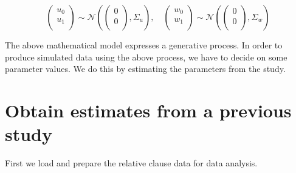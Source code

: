\documentclass[12pt,]{krantz}
\newenvironment{Shaded}{\begin{snugshade}}{\end{snugshade}}
\newcommand{\DataTypeTok}[1]{\textcolor[rgb]{0.13,0.29,0.53}{#1}}
\newcommand{\DecValTok}[1]{\textcolor[rgb]{0.00,0.00,0.81}{#1}}
\newcommand{\KeywordTok}[1]{\textcolor[rgb]{0.13,0.29,0.53}{\textbf{#1}}}
\newcommand{\NormalTok}[1]{#1}
\newcommand{\OperatorTok}[1]{\textcolor[rgb]{0.81,0.36,0.00}{\textbf{#1}}}
\newcommand{\OtherTok}[1]{\textcolor[rgb]{0.56,0.35,0.01}{#1}}
\newcommand{\StringTok}[1]{\textcolor[rgb]{0.31,0.60,0.02}{#1}}
\begin{document}
\begin{equation}\label{eq:jointpriordistsimulation}
\begin{pmatrix}
  u_0 \\ 
  u_1 \\
\end{pmatrix}
\sim 
\mathcal{N} \left(
\begin{pmatrix}
  0 \\
  0 \\
\end{pmatrix},
\Sigma_{u}
\right),
\quad
\begin{pmatrix}
  w_0 \\ 
  w_1 \\
\end{pmatrix}
\sim 
\mathcal{N}\left(
\begin{pmatrix}
  0 \\
  0 \\
\end{pmatrix},
\Sigma_{w}
\right)
\end{equation}

The above mathematical model expresses a generative process. In order to produce simulated data using the above process, we have to decide on some parameter values. We do this by estimating the parameters from the \citet{grodner} study.

\hypertarget{obtain-estimates-from-a-previous-study}{%
\section{Obtain estimates from a previous study}\label{obtain-estimates-from-a-previous-study}}

First we load and prepare the relative clause data for data analysis.

\begin{Shaded}
\end{Shaded}
\end{document}
